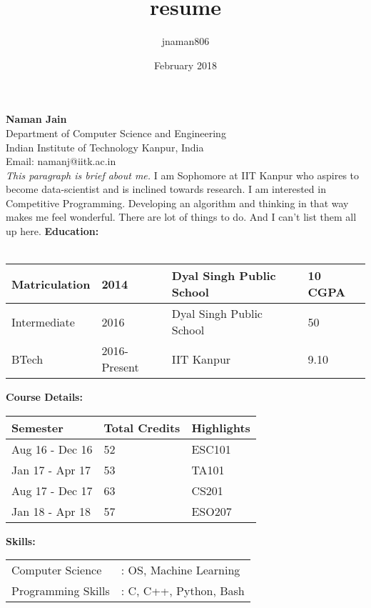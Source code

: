 \documentclass{article}
\title{resume}
\author{jnaman806 }
\date{February 2018}
\begin{document}
\noindent
\textbf{Naman Jain}\\
Department of Computer Science and Engineering\\
Indian Institute of Technology Kanpur, India\\
Email: namanj@iitk.ac.in\\
\hline
\hline 
\vspace{1em}
\noindent
\textit{This paragraph is brief about me.} I am Sophomore at IIT Kanpur who aspires to become data-scientist and is inclined towards research. I am interested in Competitive Programming.  Developing an algorithm and thinking in that way makes me feel wonderful. There are lot of things to do. And I can't list them all up here.
\vspace{1em}
\hline
\hline
\vspace{1em}
\noindent
\textbf{Education:}\\ \\
\begin{tabular}{|l|l|l|l|}
    \hline
    Matriculation & 2014 & Dyal Singh Public School & 10 CGPA\\
    \hline
    Intermediate &  2016 & Dyal Singh Public School & 50\\
    \hline
    BTech & 2016-Present & IIT Kanpur & 9.10\\
    \hline
\end{tabular}

\vspace{1em}
\noindent
\textbf{Course Details:}
\vspace{1em}\\
\begin{tabular}{|l|l|l|}
    \hline
    \textbf{Semester} & \textbf{Total Credits} & \textbf{Highlights} \\ \hline
    Aug 16 - Dec 16 & 52 & ESC101\\ \hline
    Jan 17 - Apr 17 & 53 & TA101\\   \hline
    Aug 17 - Dec 17 & 63 & CS201\\    \hline
    Jan 18 - Apr 18 & 57 & ESO207\\    \hline
\end{tabular}
\vspace{1em}

\noindent
\textbf{Skills:}
\vspace{1em}\\
\begin{tabular}{ll}
Computer Science &: OS, Machine Learning \\
Programming Skills &: C, C++, Python, Bash
\end{tabular}
\vspace{1em}
\end{document}
